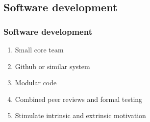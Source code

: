 \subsection{Software development}
\begin{frame}\frametitle{Software development}
    \begin{enumerate}
        \item Small core team
        \item Github or similar system
        \item Modular code
        \item Combined peer reviews and formal testing
        \item Stimulate intrinsic and extrinsic motivation
    \end{enumerate}
\end{frame}